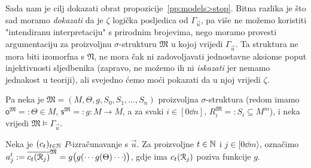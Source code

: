 Sada nam je cilj dokazati obrat propozicije~\ref{pp:models>stop}. Bitna razlika je što sad moramo \emph{dokazati} da je $\zeta$ logička posljedica od $\Gamma_{\vec u}$, pa više ne možemo koristiti "intendiranu interpretaciju" s prirodnim brojevima, nego moramo provesti argumentaciju za proizvoljnu $\sigma$-strukturu $\mathfrak M$ u kojoj vrijedi $\Gamma_{\vec u}$. Ta struktura ne mora biti izomorfna s $\mathfrak N$, ne mora čak ni zadovoljavati jednostavne aksiome poput injektivnosti sljedbenika (zapravo, ne možemo ih ni \emph{iskazati} jer nemamo jednakost u teoriji), ali svejedno ćemo moći pokazati da u njoj vrijedi $\zeta$.

Pa neka je $\mathfrak M=(M,\Theta,g,S_0,S_1,\dotsc,S_n)$ proizvoljna $\sigma$-struktura (redom imamo $\mathsf o^{\mathfrak M}=:\Theta\in M$, $\mathsf s^{\mathfrak M}=:g:M\to M$, a za svaki $i\in[0\dd n]$, $R_i^{\mathfrak M}=:S_i\subseteq M^m$), i neka vrijedi $\mathfrak M\models\Gamma_{\vec u}$.

Neka je $(c_t)_{t\in{\mathbb N}}$ $P$-izračunavanje s $\vec u$. Za proizvoljne $t\in{\mathbb N}$ i $j\in[0\dd m\rangle$, označimo\\ $a_j^t:=\overline{c_t(\mathcal R_{j})}^{\mathfrak M}=g\bigl(g(\dotsb g(\Theta)\dotsb\mspace{-1mu})\bigr)$, gdje ima $c_t(\mathcal R_{j})$ poziva funkcije $g$.

